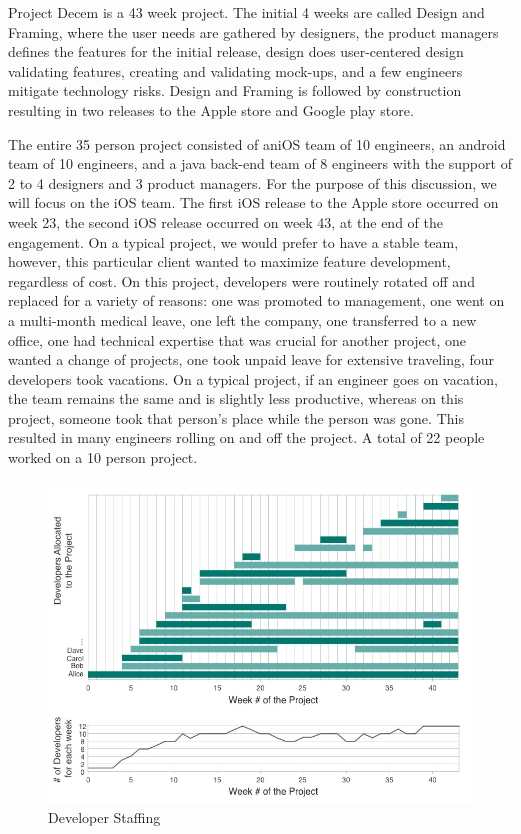 Project Decem is a 43 week project. The initial 4 weeks are called Design and Framing, where the user needs are gathered by designers, the product managers defines the features for the initial release, design does user-centered design validating features, creating and validating mock-ups, and a few engineers mitigate technology risks. Design and Framing is followed by construction resulting in two releases to the Apple store and Google play store.

The entire 35 person project consisted of aniOS team of 10 engineers, an android team of 10 engineers, and a java back-end team of 8 engineers with the support of 2 to 4 designers and 3 product managers. For the purpose of this discussion, we will focus on the iOS team. The first iOS release to the Apple store occurred on week 23, the second iOS release occurred on week 43, at the end of the engagement. On a typical project, we would prefer to have a stable team, however, this particular client wanted to maximize feature development, regardless of cost. On this project, developers were routinely rotated off and replaced for a variety of reasons: one was promoted to management, one went on a multi-month medical leave, one left the company, one transferred to a new office, one had technical expertise that was crucial for another project, one wanted a change of projects, one took unpaid leave for extensive traveling, four developers took vacations. On a typical project, if an engineer goes on vacation, the team remains the same and is slightly less productive, whereas on this project, someone took that person's place while the person was gone. This resulted in many engineers rolling on and off the project. A total of 22 people worked on a 10 person project.

\begin{figure}[t]
\centering
\includegraphics[width=7.1in]{DeveloperStaffing.jpg}
\caption{Developer Staffing}
\label{DeveloperStaffing}
\end{figure}


